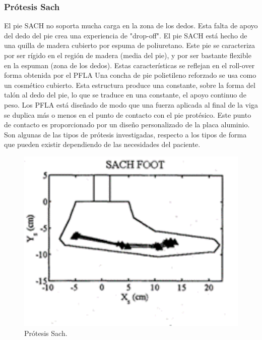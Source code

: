\documentclass{article}
\begin{document}
\subsubsection{Prótesis Sach}El pie SACH no soporta mucha carga en la zona de los dedos. Esta falta de apoyo del dedo del pie crea una experiencia de "drop-off". El pie SACH está hecho de una quilla de madera cubierto por espuma de poliuretano\cite{rf2}. Este pie se caracteriza por  ser rígido en el región de madera (media del pie), y por ser bastante flexible en la espuman (zona de los dedos). Estas características se reflejan en el roll-over forma obtenida por el PFLA Una concha de pie polietileno reforzado se usa como un cosmético cubierto. Esta estructura produce una constante, sobre la forma del talón al dedo del pie, lo que se traduce en una constante, el apoyo continuo de peso. Los PFLA está diseñado de modo que una fuerza aplicada al final de la viga se duplica más o menos en el punto de contacto con el pie protésico. Este punto de contacto es proporcionado por un diseño personalizado de la placa  aluminio.\\
Son algunas de las tipos de prótesis investigadas, respecto a los tipos de forma que pueden existir dependiendo de las necesidades del paciente.
\begin{figure}[htp] %
    \centering
    \includegraphics[width=150mm]{piecito.png} %
    \caption{Prótesis Sach.}
    \label{grafica}
\end{figure}
\newpage
\end{document}
